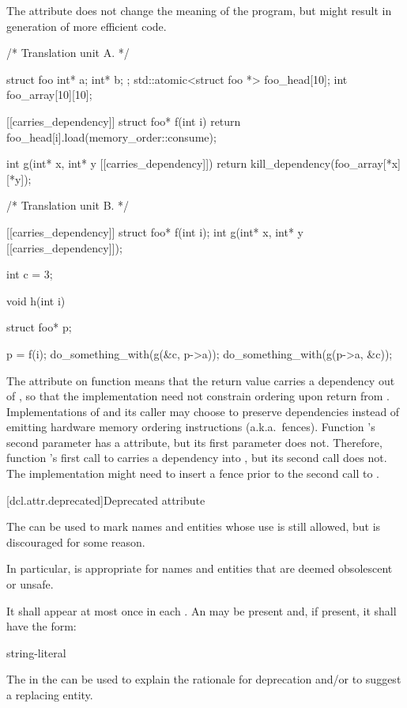 \pnum
\begin{note}
The  attribute does not change the meaning of the
program, but might result in generation of more efficient code.
\end{note}

\pnum
\begin{example}
\begin{codeblock}
/* Translation unit A. */

struct foo { int* a; int* b; };
std::atomic<struct foo *> foo_head[10];
int foo_array[10][10];

[[carries_dependency]] struct foo* f(int i) {
  return foo_head[i].load(memory_order::consume);
}

int g(int* x, int* y [[carries_dependency]]) {
  return kill_dependency(foo_array[*x][*y]);
}

/* Translation unit B. */

[[carries_dependency]] struct foo* f(int i);
int g(int* x, int* y [[carries_dependency]]);

int c = 3;

void h(int i) {
  struct foo* p;

  p = f(i);
  do_something_with(g(&c, p->a));
  do_something_with(g(p->a, &c));
}
\end{codeblock}

The  attribute on function  means that the
return value carries a dependency out of , so that the implementation
need not constrain ordering upon return from . Implementations of
 and its caller may choose to preserve dependencies instead of emitting
hardware memory ordering instructions (a.k.a.\ fences).
Function 's second parameter has a  attribute,
but its first parameter does not. Therefore, function 's first call to
 carries a dependency into , but its second call does not. The
implementation might need to insert a fence prior to the second call to
.
\end{example}
%

[dcl.attr.deprecated]{Deprecated attribute}%

\pnum
The   can be used to mark names and entities
whose use is still allowed, but is discouraged for some reason.
\begin{note}
In particular,
 is appropriate for names and entities that are deemed obsolescent or
unsafe.
\end{note}
It shall appear at most once in each . An
 may be present and, if present, it shall have the form:
\begin{ncbnf}
\terminal{(} string-literal \terminal{)}
\end{ncbnf}
\begin{note}
The  in the 
can be used to explain the rationale for deprecation and/or to suggest a replacing entity.
\end{note}

